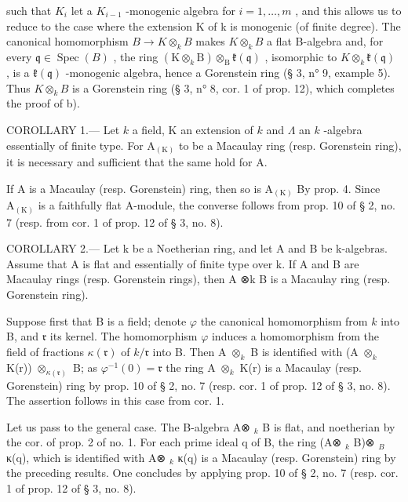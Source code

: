 such that \(K_{i}\) let a \(K_{i-1}\) -monogenic algebra for \(i = 1, \ldots, m\) , and this allows us to reduce to the case where the extension K of k is monogenic (of finite degree). The canonical homomorphism \(B \to K \otimes_{k} B\) makes \(K \otimes_{k} B\) a flat B-algebra and, for every \(\mathfrak{q} \in \operatorname{Spec}(B)\) , the ring \((\mathrm{K} \otimes_{k} \mathrm{B}) \otimes_{\mathrm{B}} \mathfrak{k}(\mathfrak{q})\) , isomorphic to \(K \otimes_{k} \mathfrak{k}(\mathfrak{q})\) , is a \(\mathfrak{k}(\mathfrak{q})\) -monogenic algebra, hence a Gorenstein ring (§ 3, n° 9, example 5). Thus \(K \otimes_{k} B\) is a Gorenstein ring (§ 3, n° 8, cor. 1 of prop. 12), which completes the proof of b).

COROLLARY 1.--- Let \(k\) a field, K an extension of \(k\) and \(\Lambda\) an \(k\) -algebra essentially of finite type. For \(\mathrm{A}_{(\mathrm{K})}\) to be a Macaulay ring (resp. Gorenstein ring), it is necessary and sufficient that the same hold for A.

If A is a Macaulay (resp. Gorenstein) ring, then so is \(\mathrm{A}_{(\mathrm{K})}\) By prop. 4. Since \(\mathrm{A}_{(\mathrm{K})}\) is a faithfully flat A-module, the converse follows from prop. 10 of § 2, no. 7 (resp. from cor. 1 of prop. 12 of § 3, no. 8).

COROLLARY 2.--- Let k be a Noetherian ring, and let A and B be k-algebras. Assume that A is flat and essentially of finite type over k. If A and B are Macaulay rings (resp. Gorenstein rings), then A ⊗k B is a Macaulay ring (resp. Gorenstein ring).

Suppose first that B is a field; denote \(\varphi\) the canonical homomorphism from \(k\) into B, and \(\mathfrak{r}\) its kernel. The homomorphism \(\varphi\) induces a homomorphism from the field of fractions \(\kappa(\mathfrak{r})\) of \(k/\mathfrak{r}\) into B. Then A \(\otimes_{k}\) B is identified with (A \(\otimes_{k}\) K(r)) \(\otimes_{\kappa(\mathfrak{r})}\) B; as \(\varphi^{-1}(0)=\mathfrak{r}\) the ring A \(\otimes_{k}\) K(r) is a Macaulay (resp. Gorenstein) ring by prop. 10 of § 2, no. 7 (resp. cor. 1 of prop. 12 of § 3, no. 8). The assertion follows in this case from cor. 1.

Let us pass to the general case. The B-algebra A⊗ \(_{k}\) B is flat, and noetherian by the cor. of prop. 2 of no. 1. For each prime ideal q of B, the ring (A⊗ \(_{k}\) B)⊗ \(_{B}\) κ(q), which is identified with A⊗ \(_{k}\) κ(q) is a Macaulay (resp. Gorenstein) ring by the preceding results. One concludes by applying prop. 10 of § 2, no. 7 (resp. cor. 1 of prop. 12 of § 3, no. 8).

